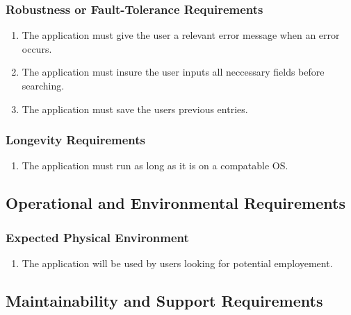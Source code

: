 \documentclass[english]{article}
\begin{document}
\subsubsection{Robustness or Fault-Tolerance Requirements}
\label{ssub:robustness_or_fault_tolerance_requirements}
\begin{enumerate}[{RFR}1. ]
\item The application must give the user a relevant error message when an error occurs. 

\item The application must insure the user inputs all neccessary fields before searching. 

\item The application must save the users previous entries. 

\end{enumerate}

\subsubsection{Longevity Requirements}
\label{ssub:longevity_requirements}
\begin{enumerate}[{LONGR}1. ]
\item The application must run as long as it is on a compatable OS. 
\end{enumerate}


\subsection{Operational and Environmental Requirements}
\label{sub:operational_and_environmental_requirements}

\subsubsection{Expected Physical Environment}
\label{ssub:expected_physical_environment}
\begin{enumerate}[{EPE}1. ]
\item The application will be used by users looking for potential employement. 

\end{enumerate}



\subsection{Maintainability and Support Requirements}
\label{sub:maintainability_and_support_requirements}
\end{document}
